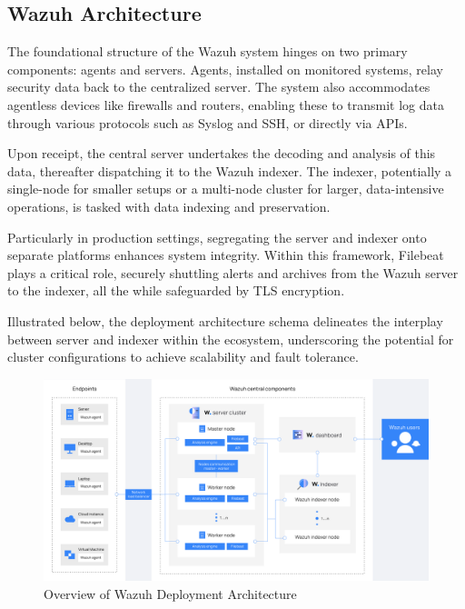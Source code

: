 \subsection{Wazuh Architecture}

The foundational structure of the Wazuh system hinges on two primary components: agents and servers. Agents, installed on monitored systems, relay security data back to the centralized server. The system also accommodates agentless devices like firewalls and routers, enabling these to transmit log data through various protocols such as Syslog and SSH, or directly via APIs.

Upon receipt, the central server undertakes the decoding and analysis of this data, thereafter dispatching it to the Wazuh indexer. The indexer, potentially a single-node for smaller setups or a multi-node cluster for larger, data-intensive operations, is tasked with data indexing and preservation.

Particularly in production settings, segregating the server and indexer onto separate platforms enhances system integrity. Within this framework, Filebeat plays a critical role, securely shuttling alerts and archives from the Wazuh server to the indexer, all the while safeguarded by TLS encryption.

Illustrated below, the deployment architecture schema delineates the interplay between server and indexer within the ecosystem, underscoring the potential for cluster configurations to achieve scalability and fault tolerance.

\begin{figure} [H]
\centering
\includegraphics[width=\textwidth]{images/introduction/architecture.png}
\caption{Overview of Wazuh Deployment Architecture}
\label{fig:wazuharchitecture}
\end{figure}
